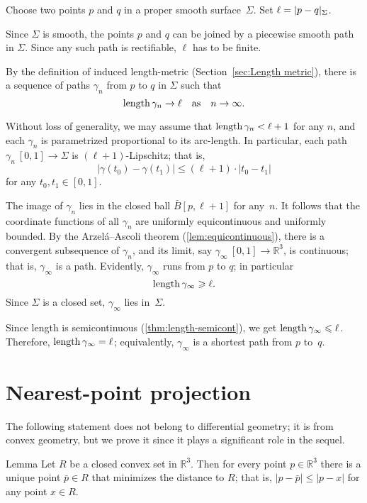 {
Choose two points $p$ and $q$ in a proper smooth surface~$\Sigma$.
Set $\ell=\dist{p}{q}\Sigma$.

Since $\Sigma$ is smooth, the points $p$ and $q$ can be joined by a piecewise smooth path in $\Sigma$.
Since any such path is rectifiable, $\ell$ has to be finite.

By the definition of induced length-metric (Section~\ref{sec:Length metric}),
there is a sequence of paths $\gamma_n$ from $p$ to $q$ in $\Sigma$ such that
\[\mathop{\rm length}\nolimits\gamma_n\to \ell\quad\text{as}\quad n\to \infty.\]

Without loss of generality, we may assume that $\mathop{\rm length}\nolimits\gamma_n<\ell+1$ for any $n$, and each $\gamma_n$ is parametrized proportional to its arc-length.
In particular, each path $\gamma_n\:[0,1]\to\Sigma$ is $(\ell+1)$-Lipschitz; 
that is,
\[|\gamma(t_0)-\gamma(t_1)|\le (\ell+1)\cdot|t_0-t_1|\]
for any $t_0,t_1\in[0,1]$.

The image of $\gamma_n$ lies in the closed ball $\bar B[p,\ell+1]$ for any~$n$.
It follows that the coordinate functions of all $\gamma_n$ are uniformly equicontinuous and uniformly bounded.
By the Arzel\'{a}--Ascoli theorem (\ref{lem:equicontinuous}),
 there is a convergent subsequence of $\gamma_n$, and its limit, say $\gamma_\infty\:[0,1]\to\mathbb{R}^3$, is continuous;
that is, $\gamma_\infty$ is a path.
Evidently, $\gamma_\infty$ runs from $p$ to $q$;
in particular
\[\mathop{\rm length}\nolimits\gamma_\infty\geqslant \ell.\]
Since $\Sigma$ is a closed set, $\gamma_\infty$ lies in~$\Sigma$.

Since length is semicontinuous (\ref{thm:length-semicont}), we get $\mathop{\rm length}\nolimits\gamma_\infty\leqslant \ell$.
Therefore, $\length\gamma_\infty\z= \ell$; equivalently, $\gamma_\infty$ is a shortest path from $p$ to~$q$.
\qeds

\section{Nearest-point projection}

The following statement does not belong to differential geometry;
it is from convex geometry,
but we prove it since it plays a significant role in the sequel.

\begin{thm}{Lemma}\label{lem:nearest-point-projection}
Let $R$ be a closed convex set in $\mathbb{R}^3$.
Then for every point $p\in\mathbb{R}^3$ there is a unique point $\bar p\in R$ that minimizes the distance to $R$;
that is, $|p-\bar p|\le |p-x|$ for any point $x\in R$.


\end{thm}}
